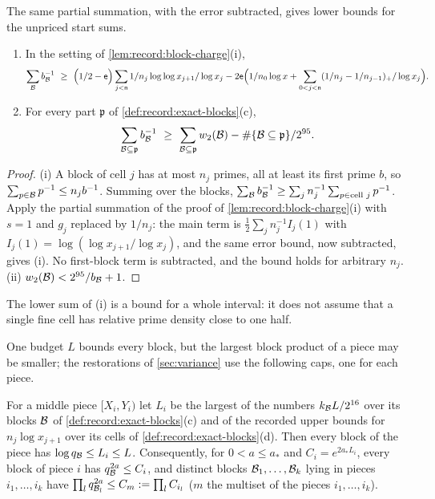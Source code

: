 The same partial summation, with the error subtracted, gives lower bounds
for the unpriced start sums.

\begin{lemma}\label{lem:record:lower-start-sums}
\leavevmode
\begin{enumerate}[label=(\roman*)]
\item In the setting of \cref{lem:record:block-charge}(i),
 \[
  \sum_{\Blk}b_{\Blk}^{-1}\ \ge\ \Bigl(\frac12-\mathsf e\Bigr)
   \sum_{j<\mathsf n}\frac1{n_j}\log\frac{\log x_{j+1}}{\log x_j}
   -2\mathsf e\Bigl(\frac1{n_0\log x}
   +\sum_{0<j<\mathsf n}\frac{(1/n_j-1/n_{j-1})_+}{\log x_j}\Bigr).
 \]
\item For every part $\mathfrak p$ of \cref{def:record:exact-blocks}(c),
 \[
  \sum_{\mathcal B\subseteq\mathfrak p}b_{\mathcal B}^{-1}\ \ge\
  \sum_{\mathcal B\subseteq\mathfrak p}w_2(\mathcal B)-\#\{\mathcal B\subseteq\mathfrak p\}/2^{95} .
 \]
\end{enumerate}
\end{lemma}

\begin{proof}
(i) A block of cell $j$ has at most $n_j$ primes, all at least its first
prime $b$, so $\sum_{p\in\mathcal B}p^{-1}\le n_jb^{-1}$. Summing over the blocks,
$\sum_{\mathcal B}b_{\mathcal B}^{-1}\ge\sum_j n_j^{-1}\sum_{p\in\text{cell }j}p^{-1}$.
Apply the partial summation of the proof of
\cref{lem:record:block-charge}(i) with $s=1$ and $g_j$ replaced by $1/n_j$:
the main term is $\frac12\sum_jn_j^{-1}I_j(1)$ with
$I_j(1)=\log(\log x_{j+1}/\log x_j)$, and the same error bound, now
subtracted, gives (i). No first-block term is subtracted, and the bound
holds for arbitrary $n_j$. (ii) $w_2(\mathcal B)<2^{95}/b_{\mathcal B}+1$.
\end{proof}

The lower sum of (i) is a bound for a whole interval: it does not assume
that a single fine cell has relative prime density close to one half.

One budget $L$ bounds every block, but the largest block product of a piece
may be smaller; the restorations of \cref{sec:variance} use the following caps,
one for each piece.

\begin{lemma}\label{lem:piece-caps}
For a middle piece $[X_i,Y_i)$ let $L_i$ be the largest of the numbers
$k_{\mathcal B}L/2^{16}$ over its blocks $\mathcal B$ of
\cref{def:record:exact-blocks}(c) and of the recorded upper bounds for
$n_j\log x_{j+1}$ over its cells of \cref{def:record:exact-blocks}(d). Then
every block of the piece has $\log q_{\mathcal B}\le L_i\le L$. Consequently, for
$0<a\le a_*$ and $C_i=e^{2a_*L_i}$, every block of piece $i$ has
$q_{\mathcal B}^{2a}\le C_i$, and distinct blocks $\mathcal B_1,\dots,\mathcal B_k$ lying in
pieces $i_1,\dots,i_k$ have $\prod_lq_{\mathcal B_l}^{2a}\le C_m:=\prod_lC_{i_l}$
($m$ the multiset of the pieces $i_1,\dots,i_k$).
\end{lemma}

